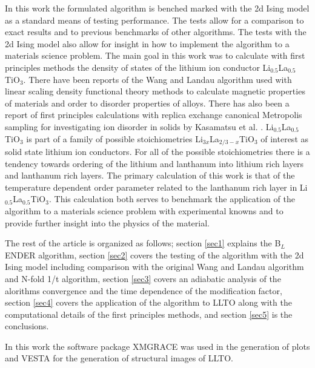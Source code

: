 \documentclass[aps,pre,reprint,superscriptaddress,showkeys]{revtex4-1}
\begin{document}
   In this work the formulated algorithm is benched marked with the 2d Ising model as a standard means of testing  performance.  The tests allow for a comparison to exact results and to previous benchmarks of other algorithms. The tests with the 2d Ising model also allow for insight in how to implement the algorithm to a materials science problem. The main goal in this work  was to calculate with first principles methods the  density of states of the lithium ion conductor Li$_{0.5}$La$_{0.5}$TiO$_3$. There  have been  reports of the Wang and Landau algorithm used with linear scaling density functional theory methods to calculate magnetic properties of materials and order to disorder properties of alloys\cite{Eisenbach, FP_Wang_Landau_CuZn}. There has also been a report of first principles calculations with replica exchange canonical Metropolis sampling for investigating ion disorder in solids by Kasamatsu et al. \cite{ion_disorder_replica}.  Li$_{0.5}$La$_{0.5}$TiO$_3$ is part of a family of possible stoichiometries Li$_{3x}$La$_{2/3 -x}$TiO$_3$ of interest as solid state lithium ion conductors\cite{domainboundaries,P4mmmstrucuture,imaginary_phonons,GENG2009555,peculiarities,LLTOreview,Li_La_ordering_computational}. For all of the possible stoichiometries there is a tendency towards ordering of the lithium and lanthanum into lithium rich layers and lanthanum rich layers.  The primary calculation of this work is that of the temperature dependent order parameter related to the lanthanum rich layer in Li$_{0.5}$La$_{0.5}$TiO$_3$. This calculation both serves to benchmark the application of the algorithm to a materials science problem with experimental knowns and to provide further insight into the physics of the material. 
   
   The rest of the article is organized as follows; section \ref{sec1} explains the B$_{L}$ENDER algorithm, section \ref{sec2} covers the testing of the algorithm with the 2d Ising model including comparison with the original Wang and Landau algorithm and N-fold 1/t algorithm, section \ref{sec3} covers an adiabatic analysis of the alorithms convergence and the time dependence of the modification factor, section \ref{sec4} covers the application of the algorithm to LLTO along with the computational details of the first principles methods, and section \ref{sec5} is the conclusions. 
   
   In this work the software package XMGRACE\cite{XMGRACE} was used in the generation of plots and VESTA\cite{Vesta}  for the generation of structural images of LLTO.
\end{document}
